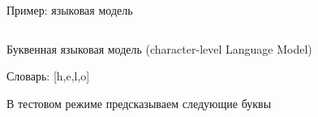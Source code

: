 \documentclass[notes,12pt, aspectratio=169]{beamer}
\newenvironment{wideitemize}{\itemize\addtolength{\itemsep}{10pt}}{\enditemize}
\begin{document}
\begin{frame}{Пример: языковая модель}
\begin{columns}
	\begin{column}{.4\linewidth}
		\begin{wideitemize} 
			\item  Буквенная языковая модель (character-level Language Model)
			\item Словарь:  [h,e,l,o]
			\item В тестовом режиме предсказываем следующие буквы
		\end{wideitemize}
	\end{column}	
	\begin{column}{.7\linewidth}			
		\begin{center}

\end{center}
\end{column}
\end{columns}
\end{frame}
\end{document}
